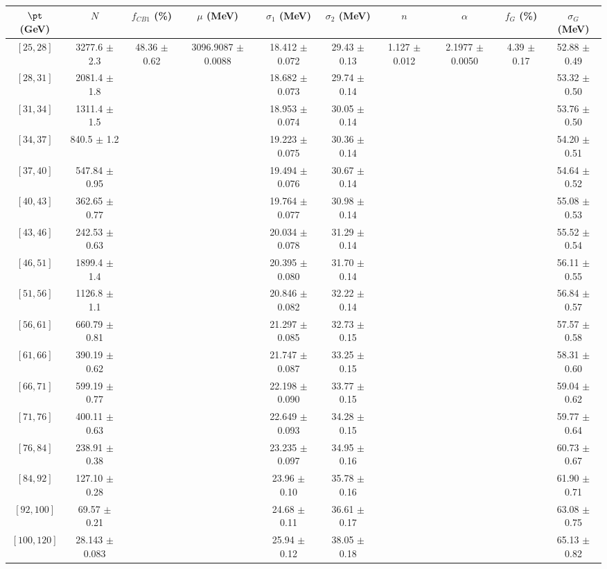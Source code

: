 \begin{tabular}{c||c|c|c|c|c|c|c|c|c}
$\pt$ (GeV) & $N$ & $f_{CB1}$ (\%)  & $\mu$ (MeV) & $\sigma_1$ (MeV) & $\sigma_2$ (MeV) & $n$ & $\alpha$ & $f_G$ (\%) & $\sigma_G$ (MeV) \\
\hline
$[25, 28]$ & 3277.6 $\pm$ 2.3 & \multirow{17}{*}{48.36 $\pm$ 0.62} & \multirow{17}{*}{3096.9087 $\pm$ 0.0088} & 18.412 $\pm$ 0.072 & 29.43 $\pm$ 0.13 & \multirow{17}{*}{1.127 $\pm$ 0.012} & \multirow{17}{*}{2.1977 $\pm$ 0.0050} & \multirow{17}{*}{4.39 $\pm$ 0.17} & 52.88 $\pm$ 0.49\\
$[28, 31]$ & 2081.4 $\pm$ 1.8 &  &  & 18.682 $\pm$ 0.073 & 29.74 $\pm$ 0.14 &  &  &  & 53.32 $\pm$ 0.50\\
$[31, 34]$ & 1311.4 $\pm$ 1.5 &  &  & 18.953 $\pm$ 0.074 & 30.05 $\pm$ 0.14 &  &  &  & 53.76 $\pm$ 0.50\\
$[34, 37]$ & 840.5 $\pm$ 1.2 &  &  & 19.223 $\pm$ 0.075 & 30.36 $\pm$ 0.14 &  &  &  & 54.20 $\pm$ 0.51\\
$[37, 40]$ & 547.84 $\pm$ 0.95 &  &  & 19.494 $\pm$ 0.076 & 30.67 $\pm$ 0.14 &  &  &  & 54.64 $\pm$ 0.52\\
$[40, 43]$ & 362.65 $\pm$ 0.77 &  &  & 19.764 $\pm$ 0.077 & 30.98 $\pm$ 0.14 &  &  &  & 55.08 $\pm$ 0.53\\
$[43, 46]$ & 242.53 $\pm$ 0.63 &  &  & 20.034 $\pm$ 0.078 & 31.29 $\pm$ 0.14 &  &  &  & 55.52 $\pm$ 0.54\\
$[46, 51]$ & 1899.4 $\pm$ 1.4 &  &  & 20.395 $\pm$ 0.080 & 31.70 $\pm$ 0.14 &  &  &  & 56.11 $\pm$ 0.55\\
$[51, 56]$ & 1126.8 $\pm$ 1.1 &  &  & 20.846 $\pm$ 0.082 & 32.22 $\pm$ 0.14 &  &  &  & 56.84 $\pm$ 0.57\\
$[56, 61]$ & 660.79 $\pm$ 0.81 &  &  & 21.297 $\pm$ 0.085 & 32.73 $\pm$ 0.15 &  &  &  & 57.57 $\pm$ 0.58\\
$[61, 66]$ & 390.19 $\pm$ 0.62 &  &  & 21.747 $\pm$ 0.087 & 33.25 $\pm$ 0.15 &  &  &  & 58.31 $\pm$ 0.60\\
$[66, 71]$ & 599.19 $\pm$ 0.77 &  &  & 22.198 $\pm$ 0.090 & 33.77 $\pm$ 0.15 &  &  &  & 59.04 $\pm$ 0.62\\
$[71, 76]$ & 400.11 $\pm$ 0.63 &  &  & 22.649 $\pm$ 0.093 & 34.28 $\pm$ 0.15 &  &  &  & 59.77 $\pm$ 0.64\\
$[76, 84]$ & 238.91 $\pm$ 0.38 &  &  & 23.235 $\pm$ 0.097 & 34.95 $\pm$ 0.16 &  &  &  & 60.73 $\pm$ 0.67\\
$[84, 92]$ & 127.10 $\pm$ 0.28 &  &  & 23.96 $\pm$ 0.10 & 35.78 $\pm$ 0.16 &  &  &  & 61.90 $\pm$ 0.71\\
$[92, 100]$ & 69.57 $\pm$ 0.21 &  &  & 24.68 $\pm$ 0.11 & 36.61 $\pm$ 0.17 &  &  &  & 63.08 $\pm$ 0.75\\
$[100, 120]$ & 28.143 $\pm$ 0.083 &  &  & 25.94 $\pm$ 0.12 & 38.05 $\pm$ 0.18 &  &  &  & 65.13 $\pm$ 0.82\\
\end{tabular}
